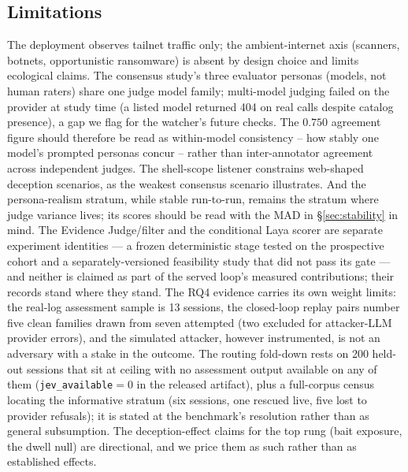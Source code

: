 \subsection{Limitations}
The deployment observes tailnet traffic only; the ambient-internet axis
(scanners, botnets, opportunistic ransomware) is absent by design choice
and limits ecological claims. The consensus study's three evaluator
personas (models, not human raters) share one judge model family; multi-model judging failed on the
provider at study time (a listed model returned 404 on real calls despite
catalog presence), a gap we flag for the watcher's future checks. The
$0.750$ agreement figure should therefore be read as within-model
consistency -- how stably one model's prompted personas concur -- rather
than inter-annotator agreement across independent judges. The shell-scope listener constrains web-shaped deception scenarios, as the
weakest consensus scenario illustrates. And the persona-realism stratum,
while stable run-to-run, remains the stratum where judge variance lives;
its scores should be read with the MAD in \S\ref{sec:stability} in mind.
The Evidence Judge/filter and the conditional Laya scorer are separate
experiment identities --- a frozen deterministic stage tested on the
prospective cohort and a separately-versioned feasibility study that did
not pass its gate --- and neither is claimed as part of the served loop's
measured contributions; their records stand where they stand.
The RQ4 evidence carries its own weight limits: the real-log assessment
sample is 13 sessions, the closed-loop replay pairs number five
clean families drawn from seven attempted (two excluded for attacker-LLM
provider errors), and the simulated attacker, however instrumented, is
not an adversary with a stake in the outcome. The routing fold-down rests on
200 held-out sessions that sit at ceiling with no assessment output
available on any of them (\texttt{jev\_available}$=0$ in the released
artifact), plus a full-corpus census locating the
informative stratum (six sessions, one rescued live, five lost to
provider refusals); it is stated at the benchmark's resolution rather
than as general subsumption. The deception-effect claims for the
top rung (bait exposure, the dwell null) are directional, and we price
them as such rather than as established effects.

